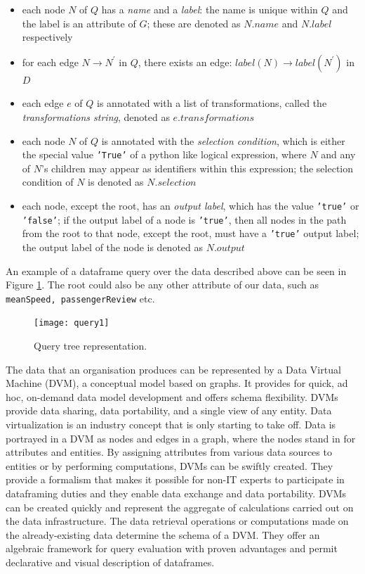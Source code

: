 \begin{itemize}
    \item each node \(N\) of \(Q\) has a \textit{name} and a \textit{label}: the name is unique within \(Q\) and the label is an attribute of \(G\); these are denoted as \(N.name\) and \(N.label\) respectively
    \item for each edge \(N \to N^'\) in \(Q\), there exists an edge: \(label(N) \to label(N^')\) in \(D\)
    \item each edge \(e\) of \(Q\) is annotated with a list of transformations, called the \textit{transformations string}, denoted as \(e.transformations\)
    \item each node \(N\) of \(Q\) is annotated with the \textit{selection condition}, which is either the special value \texttt{'True'} of a python like logical expression, where \(N\) and any of \(N\)'s children may appear as identifiers within this expression; the selection condition of \(N\) is denoted as \(N.selection\)
    \item each node, except the root, has an \textit{output label}, which has the value \texttt{'true'} or \texttt{'false'}; if the output label of a node is \texttt{'true'}, then all nodes in the path from the root to that node, except the root, must have a \texttt{'true'} output label; the output label of the node is denoted as \(N.output\)
\end{itemize}

An example of a dataframe query over the data described above can be seen in Figure \ref{query1}. The root could also be any other attribute of our data, such as \texttt{meanSpeed, passengerReview} etc. 

\begin{center}
    \begin{figure}[h]
        \texttt{[image: query1]}
        \caption{Query tree representation.}
        \label{query1}
    \end{figure}
\end{center}

The data that an organisation produces can be represented by a Data Virtual Machine (DVM), a conceptual model based on graphs. It provides for quick, ad hoc, on-demand data model development and offers schema flexibility. DVMs provide data sharing, data portability, and a single view of any entity. Data virtualization is an industry concept that is only starting to take off. Data is portrayed in a DVM as nodes and edges in a graph, where the nodes stand in for attributes and entities. By assigning attributes from various data sources to entities or by performing computations, DVMs can be swiftly created. They provide a formalism that makes it possible for non-IT experts to participate in dataframing duties and they enable data exchange and data portability. DVMs can be created quickly and represent the aggregate of calculations carried out on the data infrastructure. The data retrieval operations or computations made on the already-existing data determine the schema of a DVM. They offer an algebraic framework for query evaluation with proven advantages and permit declarative and visual description of dataframes\cite{chatziantoniou}.

